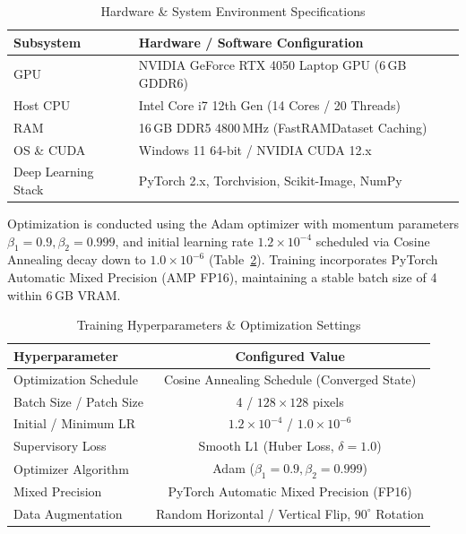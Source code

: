 \documentclass[conference]{IEEEtran}
\begin{document}
\begin{table}[t]
  \centering
  \caption{Hardware \& System Environment Specifications}
  \label{tab:hardware}
  \footnotesize
  \begin{tabular}{ll}
    \toprule
    Subsystem & Hardware / Software Configuration \\
    \midrule
    GPU & NVIDIA GeForce RTX 4050 Laptop GPU (6\,GB GDDR6) \\
    Host CPU & Intel Core i7 12th Gen (14 Cores / 20 Threads) \\
    RAM & 16\,GB DDR5 4800\,MHz (FastRAMDataset Caching) \\
    OS \& CUDA & Windows 11 64-bit / NVIDIA CUDA 12.x \\
    Deep Learning Stack & PyTorch 2.x, Torchvision, Scikit-Image, NumPy \\
    \bottomrule
  \end{tabular}
\end{table}

Optimization is conducted using the Adam optimizer with momentum parameters $\beta_1=0.9, \beta_2=0.999$, and initial learning rate $1.2\times10^{-4}$ scheduled via Cosine Annealing decay down to $1.0\times10^{-6}$ (Table~\ref{tab:hyper}). Training incorporates PyTorch Automatic Mixed Precision (AMP FP16), maintaining a stable batch size of 4 within 6\,GB VRAM.

\begin{table}[t]
  \centering
  \caption{Training Hyperparameters \& Optimization Settings}
  \label{tab:hyper}
  \footnotesize
  \begin{tabular}{lc}
    \toprule
    Hyperparameter & Configured Value \\
    \midrule
    Optimization Schedule & Cosine Annealing Schedule (Converged State) \\
    Batch Size / Patch Size & 4 / $128 \times 128$ pixels \\
    Initial / Minimum LR & $1.2 \times 10^{-4}$ / $1.0 \times 10^{-6}$ \\
    Supervisory Loss & Smooth L1 (Huber Loss, $\delta = 1.0$) \\
    Optimizer Algorithm & Adam ($\beta_1 = 0.9, \beta_2 = 0.999$) \\
    Mixed Precision & PyTorch Automatic Mixed Precision (FP16) \\
    Data Augmentation & Random Horizontal / Vertical Flip, $90^\circ$ Rotation \\
    \bottomrule
  \end{tabular}
\end{table}
\end{document}
